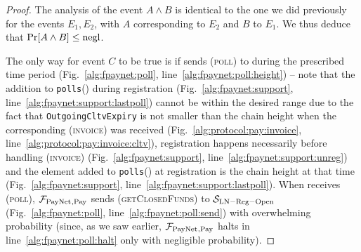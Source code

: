 \begin{proof}
  The analysis of the event $A \wedge B$ is identical to the one we did
  previously for the events $E_1, E_2$, with $A$ corresponding to $E_2$ and $B$
  to $E_1$. We thus deduce that $\Pr[A \wedge B] \leq \text{negl}$.

  The only way for event $C$ to be true is if \environment{} sends
  (\textsc{poll}) to \dave{} during the prescribed time period
  (Fig.~\ref{alg:fpaynet:poll}, line~\ref{alg:fpaynet:poll:height}) -- note that
  the addition to \texttt{polls}(\dave) during registration
  (Fig.~\ref{alg:fpaynet:support}, line~\ref{alg:fpaynet:support:lastpoll})
  cannot be within the desired range due to the fact that
  \texttt{OutgoingCltvExpiry} is not smaller than the chain height when the
  corresponding (\textsc{invoice}) was received
  (Fig.~\ref{alg:protocol:pay:invoice},
  line~\ref{alg:protocol:pay:invoice:cltv}), registration happens necessarily
  before handling (\textsc{invoice}) (Fig.~\ref{alg:fpaynet:support},
  line~\ref{alg:fpaynet:support:unreg}) and the element added to
  \texttt{polls}(\dave) at registration is the chain height at that time
  (Fig.~\ref{alg:fpaynet:support}, line~\ref{alg:fpaynet:support:lastpoll}).
  When \dave{} receives (\textsc{poll}), $\mathcal{F}_{\mathrm{PayNet}}{}_{\mathrm{, Pay}}$ sends
  (\textsc{getClosedFunds}) to $\mathcal{S}_{\mathrm{LN - Reg - Open}}$
  (Fig.~\ref{alg:fpaynet:poll}, line~\ref{alg:fpaynet:poll:send}) with
  overwhelming probability (since, as we saw earlier, $\mathcal{F}_{\mathrm{PayNet}}{}_{\mathrm{,
  Pay}}$ halts in line~\ref{alg:fpaynet:poll:halt} only with negligible
  probability).


\end{proof}
